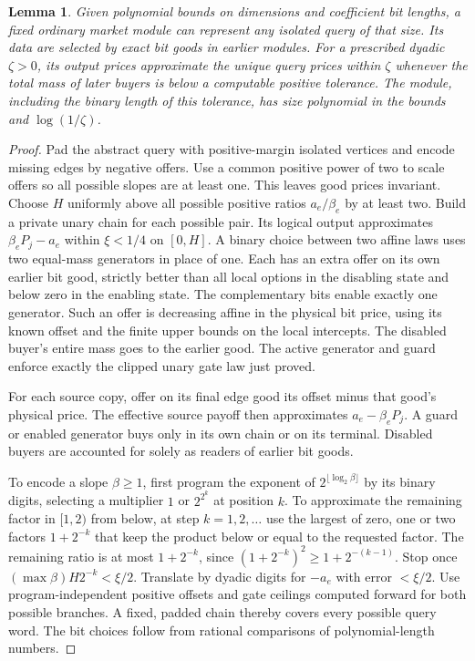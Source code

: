 \documentclass[11pt,oneside,openany,notitlepage]{report}
\newtheorem{lemma}[theorem]{Lemma}
\begin{document}
\begin{lemma}\label{lem:program}
Given polynomial bounds on dimensions and coefficient bit lengths, a fixed
ordinary market module can represent any isolated query of that size. Its
data are selected by exact bit goods in earlier modules. For a prescribed
dyadic \(\zeta>0\), its output prices approximate the unique query prices
within \(\zeta\) whenever the total mass of later buyers is below a
computable positive tolerance. The module, including the binary length
of this tolerance, has size polynomial in the bounds and \(\log(1/\zeta)\).
\end{lemma}
\begin{proof}
Pad the abstract query with positive-margin isolated vertices and encode
missing edges by negative offers. Use a common positive power of two
to scale offers so all possible slopes are at least one. This leaves
good prices invariant. Choose \(H\) uniformly above all possible positive
ratios \(a_e/\beta_e\) by at least two. Build a private unary chain for
each possible pair. Its logical output approximates
\(\beta_eP_j-a_e\) within \(\xi<1/4\) on \([0,H]\). A binary choice
between two affine laws uses two equal-mass generators in place of one.
Each has an extra offer on its own earlier bit good, strictly better than
all local options in the disabling state and below zero in the enabling
state. The complementary bits enable exactly one generator. Such an
offer is decreasing affine in the physical bit price, using its known
offset and the finite upper bounds on the local intercepts. The disabled
buyer's entire mass goes to the earlier good. The active generator and
guard enforce exactly the clipped unary gate law just proved.

For each source copy, offer on its final edge good its offset minus that
good's physical price. The effective source payoff then approximates
\(a_e-\beta_eP_j\). A guard or enabled generator buys only in its own
chain or on its terminal. Disabled buyers are accounted for solely as
readers of earlier bit goods.

To encode a slope \(\beta\ge1\), first program the exponent of
\(2^{\lfloor\log_2\beta\rfloor}\) by its binary digits, selecting a
multiplier \(1\) or \(2^{2^k}\) at position \(k\). To approximate the
remaining factor in \([1,2)\) from below, at step \(k=1,2,\ldots\)
use the largest of zero, one or two factors \(1+2^{-k}\) that keep
the product below or equal to the requested factor. The remaining ratio
is at most \(1+2^{-k}\), since
\((1+2^{-k})^2\ge1+2^{-(k-1)}\). Stop once
\((\max\beta)H2^{-k}<\xi/2\). Translate by dyadic digits for \(-a_e\)
with error \(<\xi/2\). Use program-independent positive offsets and gate
ceilings computed forward for both possible branches. A fixed, padded
chain thereby covers every possible query word. The bit choices follow
from rational comparisons of polynomial-length numbers.


\end{proof}
\end{document}
